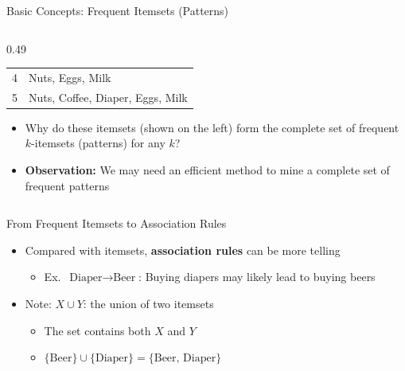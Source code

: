\documentclass[aspectratio=169, 11pt]{beamer}
\begin{document}
\begin{frame}{Basic Concepts: Frequent Itemsets (Patterns)}
\begin{columns}[T]
\begin{column}{0.49\textwidth}
\begin{tabular}{cl}
                4 & Nuts, Eggs, Milk \\
                5 & Nuts, Coffee, Diaper, Eggs, Milk \\
                \bottomrule
            \end{tabular}
            \vspace{2mm}
            \small
            \begin{itemize}
                \item Why do these itemsets (shown on the left) form the complete set of frequent $k$-itemsets (patterns) for any $k$?
                \item \textbf{Observation:} We may need an efficient method to mine a complete set of frequent patterns
            \end{itemize}
        \end{column}
    \end{columns}
\end{frame}

\begin{frame}{From Frequent Itemsets to Association Rules}
    \begin{itemize}
        \item Compared with itemsets, \textbf{association rules} can be more telling
        \begin{itemize}
            \item Ex.\ $\text{Diaper} \rightarrow \text{Beer}$: Buying diapers may likely lead to buying beers
        \end{itemize}
        \item Note: $X \cup Y$: the union of two itemsets
        \begin{itemize}
            \item The set contains both $X$ and $Y$
            \item $\{\text{Beer}\} \cup \{\text{Diaper}\} = \{\text{Beer, Diaper}\}$
        \end{itemize}
    \end{itemize}
    \vspace{2mm}
    \centering
\end{frame}
\end{document}
